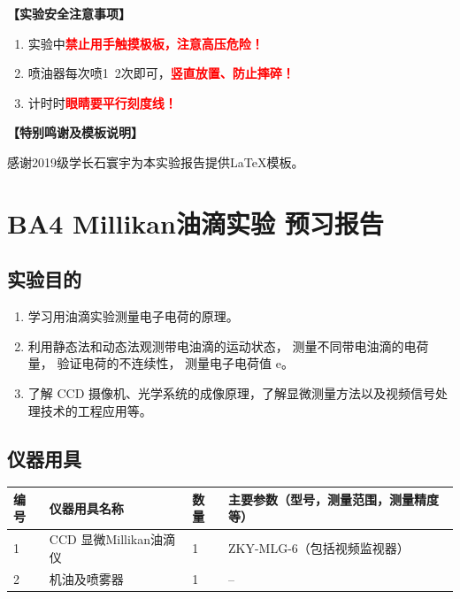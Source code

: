 \documentclass[dvipsnames, svgnames,a4paper,11pt]{article}
\begin{document}
	\textbf{【实验安全注意事项】}	
	\begin{enumerate}
		\item 实验中\textcolor{red}{\textbf{禁止用手触摸极板，注意高压危险！}}
		\item 喷油器每次喷1~2次即可，\textcolor{red}{\textbf{竖直放置、防止摔碎！}}
		\item 计时时\textcolor{red}{\textbf{眼睛要平行刻度线！}} 
	\end{enumerate}
	
	\textbf{【特别鸣谢及模板说明】}	
	
	感谢2019级学长石寰宇为本实验报告提供\LaTeX 模板。
	
	
	
	\clearpage
	\tableofcontents
	\clearpage
	
	
	
	\setcounter{section}{0}
	\section{BA4 Millikan油滴实验 \quad\heiti 预习报告}
	
	\subsection{实验目的}
	\begin{enumerate}
		\item 学习用油滴实验测量电子电荷的原理。
		\item 利用静态法和动态法观测带电油滴的运动状态， 测量不同带电油滴的电荷量， 验证电荷的不连续性， 测量电子电荷值 e。
		\item 了解 CCD 摄像机、光学系统的成像原理，了解显微测量方法以及视频信号处理技术的工程应用等。
	\end{enumerate}
	
	\subsection{仪器用具}
	\begin{table}[htbp]
		\centering
		\renewcommand\arraystretch{1.6}
		\begin{tabular}{p{}|p{}|p{}|p{}}
			\hline
			编号& 仪器用具名称 & 数量 &  主要参数（型号，测量范围，测量精度等） \\
			\hline
			1& CCD 显微Millikan油滴仪 &1 & ZKY-MLG-6（包括视频监视器） \\
			
			2& 机油及喷雾器 &1 & -- \\
			\hline
		\end{tabular}
	\end{table}
	
\end{document}
